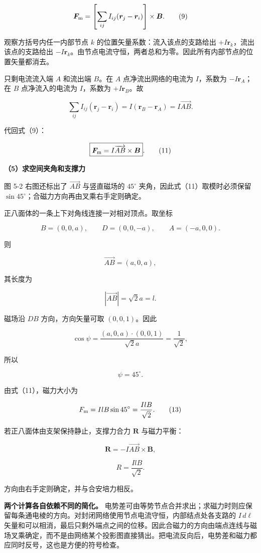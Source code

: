 \documentclass[12pt,a4paper,UTF8]{ctexart}
\begin{document}
\[
\bm F_{\rm m}
=\left[\sum_{ij}I_{ij}(\bm r_j-\bm r_i)\right]\times\bm B.
\tag{9}
\]

观察方括号内任一内部节点 \(k\) 的位置矢量系数：流入该点的支路给出
\(+I\bm r_k\)，流出该点的支路给出
\(-I\bm r_k\)。由节点电流守恒，两者总和为零。因此所有内部节点的位置矢量都消去。

只剩电流流入端 \(A\) 和流出端 \(B\)。在 \(A\) 点净流出网络的电流为
\(I\)，系数为 \(-I\bm r_A\)；在 \(B\) 点净流入的电流为 \(I\)，系数为
\(+I\bm r_B\)。故

\[
\sum_{ij}I_{ij}(\bm r_j-\bm r_i)
=I(\bm r_B-\bm r_A)
=I\overrightarrow{AB}.
\tag{10}
\]

代回式（9）：

\[
\boxed{\bm F_{\rm m}=I\overrightarrow{AB}\times\bm B}.
\tag{11}
\]

\textbf{（5）求空间夹角和支撑力}

图 5-2 右图还标出了 \(\overrightarrow{AB}\) 与竖直磁场的 \(45^\circ\)
夹角，因此式（11）取模时必须保留
\(\sin45^\circ\)；合磁力方向再由叉乘右手定则确定。

正八面体的一条上下对角线连接一对相对顶点。取坐标

\[
B=(0,0,a),
\qquad
D=(0,0,-a),
\qquad
A=(-a,0,0).
\]

则

\[
\overrightarrow{AB}=(a,0,a),
\]

其长度为

\[
|\overrightarrow{AB}|=\sqrt2a=l.
\]

磁场沿 \(DB\) 方向，方向矢量可取 \((0,0,1)\)。因此

\[
\cos\psi
=\frac{(a,0,a)\cdot(0,0,1)}{\sqrt2a}
=\frac1{\sqrt2},
\]

所以

\[
\psi=45^\circ.
\tag{12}
\]

由式（11），磁力大小为

\[
F_{\rm m}=IlB\sin45^\circ
=\frac{IlB}{\sqrt2}.
\tag{13}
\]

若正八面体由支架保持静止，支撑力合力 \(\bm R\) 与磁力平衡：

\[
\boxed{\bm R=-I\overrightarrow{AB}\times\bm B},
\]

\[
\boxed{R=\frac{IlB}{\sqrt2}}.
\tag{14}
\]

方向由右手定则确定，并与合安培力相反。

\textbf{两个计算各自依赖不同的简化。}
电势差可由等势节点合并求出；求磁力时则应保留每条通电棱的方向。对封闭网络使用节点电流守恒，内部结点处各支路的
\(I\,d\boldsymbol\ell\)
矢量和可以相消，最后只剩外端点之间的位移。因此合磁力的方向由端点连线与磁场叉乘确定，而不是由网络某个投影图直接猜出。把电流反向后，电势差和磁力都应同时反号，这也是方便的符号检查。
\end{document}
